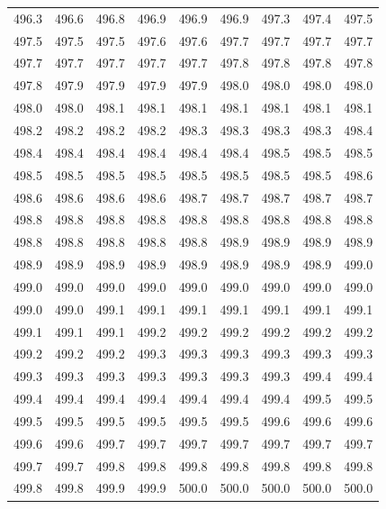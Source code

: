 \documentclass[14pt, a4paper]{article}
\begin{document}
\begin{table}
\centering
\begin{tabular}{c c c c c c c c c}

496.3 & 496.6 & 496.8 & 496.9 & 496.9 & 496.9 & 497.3 & 497.4 & 497.5 \\
497.5 & 497.5 & 497.5 & 497.6 & 497.6 & 497.7 & 497.7 & 497.7 & 497.7 \\
497.7 & 497.7 & 497.7 & 497.7 & 497.7 & 497.8 & 497.8 & 497.8 & 497.8 \\
497.8 & 497.9 & 497.9 & 497.9 & 497.9 & 498.0 & 498.0 & 498.0 & 498.0 \\
498.0 & 498.0 & 498.1 & 498.1 & 498.1 & 498.1 & 498.1 & 498.1 & 498.1 \\
498.2 & 498.2 & 498.2 & 498.2 & 498.3 & 498.3 & 498.3 & 498.3 & 498.4 \\
498.4 & 498.4 & 498.4 & 498.4 & 498.4 & 498.4 & 498.5 & 498.5 & 498.5 \\
498.5 & 498.5 & 498.5 & 498.5 & 498.5 & 498.5 & 498.5 & 498.5 & 498.6 \\
498.6 & 498.6 & 498.6 & 498.6 & 498.7 & 498.7 & 498.7 & 498.7 & 498.7 \\
498.8 & 498.8 & 498.8 & 498.8 & 498.8 & 498.8 & 498.8 & 498.8 & 498.8 \\
498.8 & 498.8 & 498.8 & 498.8 & 498.8 & 498.9 & 498.9 & 498.9 & 498.9 \\
498.9 & 498.9 & 498.9 & 498.9 & 498.9 & 498.9 & 498.9 & 498.9 & 499.0 \\
499.0 & 499.0 & 499.0 & 499.0 & 499.0 & 499.0 & 499.0 & 499.0 & 499.0 \\
499.0 & 499.0 & 499.1 & 499.1 & 499.1 & 499.1 & 499.1 & 499.1 & 499.1 \\
499.1 & 499.1 & 499.1 & 499.2 & 499.2 & 499.2 & 499.2 & 499.2 & 499.2 \\
499.2 & 499.2 & 499.2 & 499.3 & 499.3 & 499.3 & 499.3 & 499.3 & 499.3 \\
499.3 & 499.3 & 499.3 & 499.3 & 499.3 & 499.3 & 499.3 & 499.4 & 499.4 \\
499.4 & 499.4 & 499.4 & 499.4 & 499.4 & 499.4 & 499.4 & 499.5 & 499.5 \\
499.5 & 499.5 & 499.5 & 499.5 & 499.5 & 499.5 & 499.6 & 499.6 & 499.6 \\
499.6 & 499.6 & 499.7 & 499.7 & 499.7 & 499.7 & 499.7 & 499.7 & 499.7 \\
499.7 & 499.7 & 499.8 & 499.8 & 499.8 & 499.8 & 499.8 & 499.8 & 499.8 \\
499.8 & 499.8 & 499.9 & 499.9 & 500.0 & 500.0 & 500.0 & 500.0 & 500.0 \\

\end{tabular}
\end{table}
\end{document}
